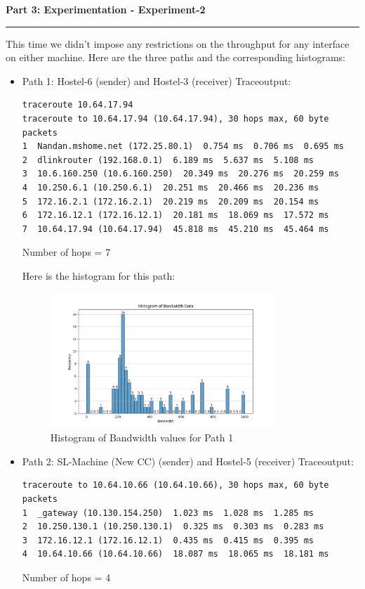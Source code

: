 \documentclass[a4paper,12pt]{article}
\newenvironment{solution}[2][]{%
    \begin{mdframed}[linecolor=blue!70!black, linewidth=2pt, roundcorner=10pt, backgroundcolor=yellow!10!white, skipabove=12pt, skipbelow=12pt]%
        \textbf{\large #2}
        \par\noindent\rule{\textwidth}{0.4pt}
}{
    \end{mdframed}
}
\begin{document}
\begin{solution}{Part 3: Experimentation - Experiment-2}
    This time we didn't impose any restrictions on the throughput for any interface on either machine. Here are the three paths and the corresponding histograms:
    \begin{itemize}
        \item Path 1: Hostel-6 (sender) and Hostel-3 (receiver)
        Traceoutput:
        \begin{verbatim}
traceroute 10.64.17.94
traceroute to 10.64.17.94 (10.64.17.94), 30 hops max, 60 byte packets
1  Nandan.mshome.net (172.25.80.1)  0.754 ms  0.706 ms  0.695 ms
2  dlinkrouter (192.168.0.1)  6.189 ms  5.637 ms  5.108 ms
3  10.6.160.250 (10.6.160.250)  20.349 ms  20.276 ms  20.259 ms
4  10.250.6.1 (10.250.6.1)  20.251 ms  20.466 ms  20.236 ms
5  172.16.2.1 (172.16.2.1)  20.219 ms  20.209 ms  20.154 ms
6  172.16.12.1 (172.16.12.1)  20.181 ms  18.069 ms  17.572 ms
7  10.64.17.94 (10.64.17.94)  45.818 ms  45.210 ms  45.464 ms
        \end{verbatim}
        Number of hops = 7

        Here is the histogram for this path:
        \begin{figure}[H]
            \centering
            \includegraphics[width=0.8\textwidth]{h6-h3-buffer_bandwidth_histogram.png}
            \caption{Histogram of Bandwidth values for Path 1}
        \end{figure}
        \item Path 2: SL-Machine (New CC) (sender) and Hostel-5 (receiver)
        Traceoutput:
        \begin{verbatim}
traceroute to 10.64.10.66 (10.64.10.66), 30 hops max, 60 byte packets
1  _gateway (10.130.154.250)  1.023 ms  1.028 ms  1.285 ms
2  10.250.130.1 (10.250.130.1)  0.325 ms  0.303 ms  0.283 ms
3  172.16.12.1 (172.16.12.1)  0.435 ms  0.415 ms  0.395 ms
4  10.64.10.66 (10.64.10.66)  18.087 ms  18.065 ms  18.181 ms      
\end{verbatim}   
Number of hops = 4


\end{itemize}
\end{solution}
\end{document}
